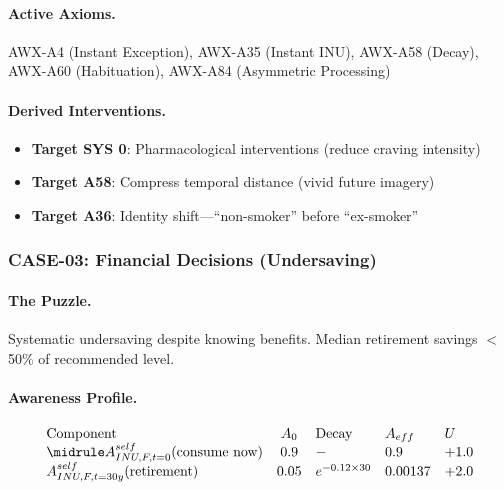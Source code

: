 \paragraph{Active Axioms.} AWX-A4 (Instant Exception), AWX-A35 (Instant INU), AWX-A58 (Decay), AWX-A60 (Habituation), AWX-A84 (Asymmetric Processing)

\paragraph{Derived Interventions.}
\begin{itemize}
    \item \textbf{Target SYS 0}: Pharmacological interventions (reduce craving intensity)
    \item \textbf{Target A58}: Compress temporal distance (vivid future imagery)
    \item \textbf{Target A36}: Identity shift---``non-smoker'' before ``ex-smoker''
\end{itemize}


\subsubsection{CASE-03: Financial Decisions (Undersaving)}

\paragraph{The Puzzle.}
Systematic undersaving despite knowing benefits. Median retirement savings $<$50\% of recommended level.

\paragraph{Awareness Profile.}

\begin{equation}
\begin{array}{lclll}
\text{Component} & A_0 & \text{Decay} & A_{eff} & U \\
\midrule
A^{self}_{INU,F,t=0}(\text{consume now}) & 0.9 & - & 0.9 & +1.0 \\
A^{self}_{INU,F,t=30y}(\text{retirement}) & 0.05 & e^{-0.12 \times 30} & 0.00137 & +2.0
\end{array}
\end{equation}

